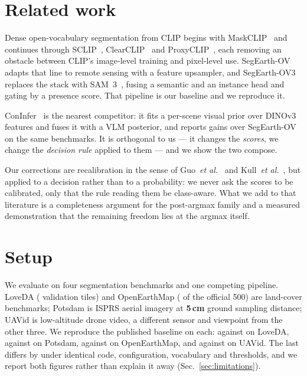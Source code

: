 \documentclass[10pt,twocolumn,letterpaper]{article}          %
\newcommand{\best}[1]{\textbf{#1}}
\providecommand{\etal}{\textit{et al.}}
\begin{document}
\section{Related work}
\label{sec:related}

Dense open-vocabulary segmentation from CLIP begins with MaskCLIP~\cite{maskclip} and
continues through SCLIP~\cite{sclip}, ClearCLIP~\cite{clearclip} and
ProxyCLIP~\cite{proxyclip}, each removing an obstacle between CLIP's image-level
training and pixel-level use. SegEarth-OV~\cite{segearthov} adapts that line to
remote sensing with a feature upsampler, and SegEarth-OV3~\cite{segearthov3} replaces
the stack with SAM~3~\cite{sam3}, fusing a semantic and an instance head and gating by
a presence score. That pipeline is our baseline and we reproduce it.

ConInfer~\cite{coninfer} is the nearest competitor: it fits a per-scene visual prior
over DINOv3 features and fuses it with a VLM posterior, and reports gains over
SegEarth-OV on the same benchmarks. It is orthogonal to us --- it changes the
\emph{scores}, we change the \emph{decision rule} applied to them --- and we show the
two compose.

Our corrections are recalibration in the sense of Guo~\etal~\cite{guo2017} and
Kull~\etal~\cite{kull2019}, but applied to a decision rather than to a probability:
we never ask the scores to be calibrated, only that the rule reading them be
class-aware. What we add to that literature is a completeness argument for the
post-argmax family and a measured demonstration that the remaining freedom lies at
the argmax itself.

\section{Setup}
\label{sec:setup}

We evaluate on four segmentation benchmarks and one competing pipeline. LoveDA
(\loveTiles{} validation tiles) and OpenEarthMap (\oemTiles{} of the official 500)
are land-cover benchmarks; Potsdam is ISPRS aerial imagery at \best{5\,cm} ground
sampling distance; UAVid is low-altitude drone video, a different sensor and
viewpoint from the other three. We reproduce the published baseline on each:
\loveBase{} against \lovePub{} on LoveDA, \potsBase{} against \potsPub{} on Potsdam,
\oemBase{} against \oemPub{} on OpenEarthMap, and \uavBase{} against \uavPub{} on
UAVid. The last differs by \uavGap{} under identical code, configuration, vocabulary
and thresholds, and we report both figures rather than explain it away
(Sec.~\ref{sec:limitations}).
\end{document}
